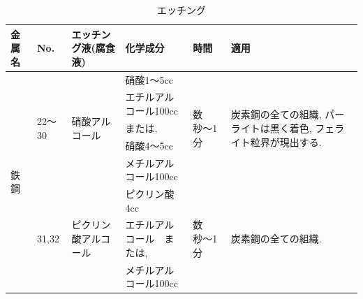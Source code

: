 \documentclass[a4paper,11pt,uplatex]{jsarticle}
\begin{document}
\begin{table}[H]
  \begin{center}
  \caption{エッチング}
  \label{エッチング}

  \begin{tabular}{|l|l|l|l|l|l|}
\hline
金属名                 & No.                    & エッチング液(腐食液)                 & 化学成分          & 時間                     & 適用                                                    \\ \hline
\multirow{8}{*}{鉄鋼} & \multirow{5}{*}{22〜30} & \multirow{5}{*}{硝酸アルコール}    & 硝酸1〜5cc       & \multirow{5}{*}{数秒〜1分} & \multirow{5}{*}{炭素鋼の全ての組織, パーライトは黒く着色, フェライト粒界が現出する.} \\
                    &                        &                             & エチルアルコール100cc &                        &                                                       \\
                    &                        &                             & または,          &                        &                                                       \\
                    &                        &                             & 硝酸4〜5cc       &                        &                                                       \\
                    &                        &                             & メチルアルコール100cc &                        &                                                       \\ \cline{2-6}
                    & \multirow{3}{*}{31,32} & \multirow{3}{*}{ピクリン酸アルコール} & ピクリン酸4cc      & \multirow{3}{*}{数秒〜1分} & \multirow{3}{*}{炭素鋼の全ての組織.}                           \\
                    &                        &                             & エチルアルコール　または, &                        &                                                       \\
                    &                        &                             & メチルアルコール100cc &                        &                                                       \\ \hline
\end{tabular}
\end{center}
\end{table}
\end{document}
